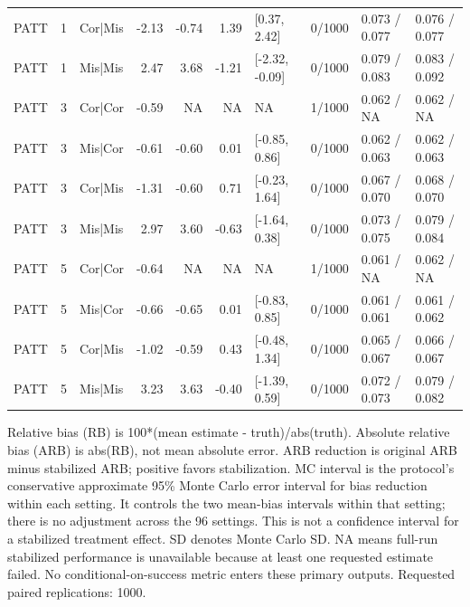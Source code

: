 \begin{table}
\begin{tabular}{lllr r r l r l l}
PATT & 1 & Cor|Mis & -2.13 & -0.74 & 1.39 & [0.37, 2.42] & 0/1000 & 0.073 / 0.077 & 0.076 / 0.077 \\
PATT & 1 & Mis|Mis & 2.47 & 3.68 & -1.21 & [-2.32, -0.09] & 0/1000 & 0.079 / 0.083 & 0.083 / 0.092 \\
PATT & 3 & Cor|Cor & -0.59 & NA & NA & NA & 1/1000 & 0.062 / NA & 0.062 / NA \\
PATT & 3 & Mis|Cor & -0.61 & -0.60 & 0.01 & [-0.85, 0.86] & 0/1000 & 0.062 / 0.063 & 0.062 / 0.063 \\
PATT & 3 & Cor|Mis & -1.31 & -0.60 & 0.71 & [-0.23, 1.64] & 0/1000 & 0.067 / 0.070 & 0.068 / 0.070 \\
PATT & 3 & Mis|Mis & 2.97 & 3.60 & -0.63 & [-1.64, 0.38] & 0/1000 & 0.073 / 0.075 & 0.079 / 0.084 \\
PATT & 5 & Cor|Cor & -0.64 & NA & NA & NA & 1/1000 & 0.061 / NA & 0.062 / NA \\
PATT & 5 & Mis|Cor & -0.66 & -0.65 & 0.01 & [-0.83, 0.85] & 0/1000 & 0.061 / 0.061 & 0.061 / 0.062 \\
PATT & 5 & Cor|Mis & -1.02 & -0.59 & 0.43 & [-0.48, 1.34] & 0/1000 & 0.065 / 0.067 & 0.066 / 0.067 \\
PATT & 5 & Mis|Mis & 3.23 & 3.63 & -0.40 & [-1.39, 0.59] & 0/1000 & 0.072 / 0.073 & 0.079 / 0.082 \\
\bottomrule
\end{tabular}
\vspace{0.5em}
\begin{minipage}{\textwidth}
\footnotesize
Relative bias (RB) is 100*(mean estimate - truth)/abs(truth). Absolute relative bias (ARB) is abs(RB), not mean absolute error. ARB reduction is original ARB minus stabilized ARB; positive favors stabilization. MC interval is the protocol's conservative approximate 95\% Monte Carlo error interval for bias reduction within each setting. It controls the two mean-bias intervals within that setting; there is no adjustment across the 96 settings. This is not a confidence interval for a stabilized treatment effect. SD denotes Monte Carlo SD. NA means full-run stabilized performance is unavailable because at least one requested estimate failed. No conditional-on-success metric enters these primary outputs. Requested paired replications: 1000.
\end{minipage}
\end{table}

